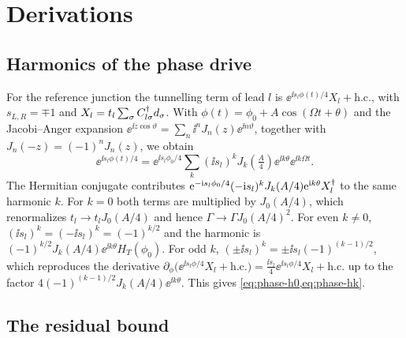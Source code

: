 \chapter{Derivations}\label{app:derivations}

\section{Harmonics of the phase drive}\label{app:jacobi}

For the reference junction the tunnelling term of lead $l$ is
$\ee^{\ii s_l\phi(t)/4}X_l+\mathrm{h.c.}$, with $s_{L,R}=\mp1$ and $X_l=t_l\sum_\sigma
C_{l\sigma}^\dagger d_\sigma$. With $\phi(t)=\phi_0+A\cos(\Omega t+\theta)$ and the Jacobi--Anger
expansion $\ee^{\ii z\cos\vartheta}=\sum_n\ii^nJ_n(z)\ee^{\ii n\vartheta}$, together with
$J_n(-z)=(-1)^nJ_n(z)$, we obtain
\begin{equation}
  \ee^{\ii s_l\phi(t)/4}=\ee^{\ii s_l\phi_0/4}\sum_k(\ii s_l)^kJ_k\!\left(\tfrac A4\right)\ee^{\ii k\theta}\ee^{\ii k\Omega t}.
\end{equation}
The Hermitian conjugate contributes $\mathrm{e}^{-\mathrm{i} s_l\phi_0/4}(-\mathrm{i} s_l)^kJ_k(A/4)\mathrm{e}^{\mathrm{i}
k\theta}X_l^\dagger$ to the same harmonic $k$. For $k=0$ both terms are multiplied by $J_0(A/4)$,
which renormalizes $t_l\to t_lJ_0(A/4)$ and hence $\Gamma\to\Gamma J_0(A/4)^2$. For even
$k\ne0$, $(\ii s_l)^k=(-\ii s_l)^k=(-1)^{k/2}$ and the harmonic is $(-1)^{k/2}J_k(A/4)\ee^{\ii
k\theta}H_T(\phi_0)$. For odd $k$, $(\pm\ii s_l)^k=\pm\ii s_l(-1)^{(k-1)/2}$, which reproduces the
derivative $\partial_\phi\bigl(\ee^{\ii s_l\phi/4}X_l+\mathrm{h.c.}\bigr)=\tfrac{\ii
s_l}4\ee^{\ii s_l\phi/4}X_l+\mathrm{h.c.}$ up to the factor $4(-1)^{(k-1)/2}J_k(A/4)\ee^{\ii
k\theta}$. This gives \cref{eq:phase-h0,eq:phase-hk}.

\section{The residual bound}\label{app:residual}

